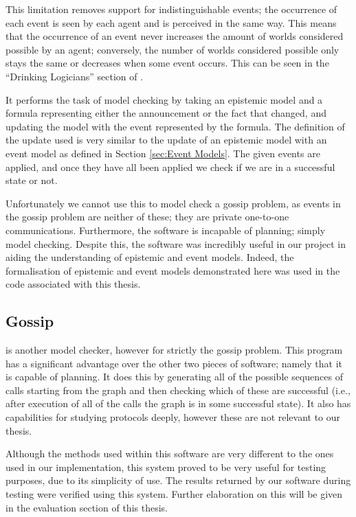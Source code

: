 \documentclass[10pt, a4paper]{report}
\begin{document}
This limitation removes support for indistinguishable events; the occurrence of
each event is seen by each agent and is perceived in the same way. This means
that the occurrence of an event never increases the amount of worlds considered
possible by an agent; conversely, the number of worlds considered possible only
stays the same or decreases when some event occurs. This can be seen in the
``Drinking Logicians'' section of \cite{DEMO-S5}.

It performs the task of model checking by taking an epistemic model and a
formula representing either the announcement or the fact that changed, and
updating the model with the event represented by the formula. The definition of
the update used is very similar to the update of an epistemic model with an
event model as defined in Section \ref{sec:Event Models}. The given events are
applied, and once they have all been applied we check if we are in a successful
state or not.

Unfortunately we cannot use this to model check a gossip problem, as events in
the gossip problem are neither of these; they are private one-to-one
communications. Furthermore, the software is incapable of planning; simply model
checking. Despite this, the software was incredibly useful in our project in
aiding the understanding of epistemic and event models. Indeed, the
formalisation of epistemic and event models demonstrated here was used in the
code associated with this thesis.

\subsection{Gossip}

\cite{GithubGossip} is another model checker, however for strictly the gossip
problem. This program has a significant advantage over the other two pieces of
software; namely that it is capable of planning. It does this by generating all
of the possible sequences of calls starting from the graph and then checking
which of these are successful (i.e., after execution of all of the calls the
graph is in some successful state). It also has capabilities for studying
protocols deeply, however these are not relevant to our thesis.

Although the methods used within this software are very different to the ones
used in our implementation, this system proved to be very useful for testing
purposes, due to its simplicity of use. The results returned by our software
during testing were verified using this system. Further elaboration on this will
be given in the evaluation section of this thesis.
\end{document}
